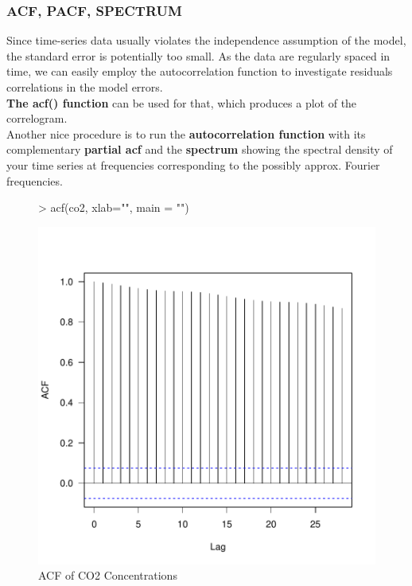 \documentclass[11pt, a4paper]{article} %
\begin{document}
\subsubsection{ACF, PACF, SPECTRUM}
\noindent Since time-series data usually violates the independence assumption of the model, the standard error is potentially too small. As the data are regularly spaced in time, we can easily employ the autocorrelation function to investigate residuals correlations in the model errors.\\
\textbf{The acf() function} can be used for that, which produces a plot of the correlogram.\\
Another nice procedure is to run the \textbf{autocorrelation function} with its complementary \textbf{partial acf} and the \textbf{spectrum} showing the spectral density of your time series at frequencies corresponding to the possibly approx. Fourier frequencies. \\

\begin{figure}[H]
\centering
\begin{Schunk}
\begin{Sinput}
> acf(co2, xlab="", main = "")
\end{Sinput}
\end{Schunk}
\includegraphics{alleselena-correlogramlm}
 \caption{ACF of CO2 Concentrations}
\label{correlogramlm}
\end{figure}
\end{document}
